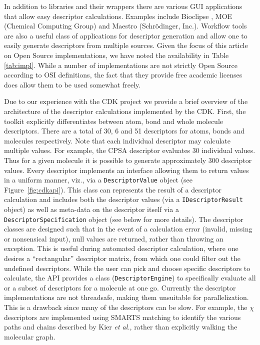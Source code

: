 \documentclass[letterpaper, 12pt]{article}
\begin{document}
In addition to libraries and their wrappers there are various GUI
applications that allow easy descriptor calculations. Examples include
Bioclipse \cite{Spjuth:2007aa}, MOE (Chemical Computing Group) and
Maestro (Schr\"{o}dinger, Inc.). Workflow tools are also a useful
class of applications for descriptor generation and allow one to
easily generate descriptors from multiple sources. Given the focus of
this article on Open Source implementations, we have noted the
availability in Table \ref{tab:impl}. While a number of
implementations are not strictly Open Source according to OSI
definitions, the fact that they provide free academic licenses does
allow them to be used somewhat freely.

Due to our experience with the CDK project we provide a brief overview
of the architecture of the descriptor calculations implemented by the
CDK. First, the toolkit explicitly differentiates between atom, bond
and whole molecule descriptors. There are a total of 30, 6 and 51
descriptors for atoms, bonds and molecules respectively. Note that
each individual descriptor may calculate multiple values. For example,
the CPSA descriptor evaluates 30 individual values. Thus for a given
molecule it is possible to generate approximately 300 descriptor
values. Every descriptor implements an interface allowing them to
return values in a uniform manner, viz., via a \texttt{DescriptorValue}
object (see Figure~\ref{fig:cdkapi}). This class can represents the result
of a descriptor calculation and includes both the descriptor values
(via a \texttt{IDescriptorResult} object) as well as meta-data on the
descriptor itself via a \texttt{DescriptorSpecification} object (see
below for more details). The descriptor classes are designed such that
in the event of a calculation error (invalid, missing or nonsensical
input), null values are returned, rather than throwing an
exception. This is useful during automated descriptor calculation,
where one desires a ``rectangular'' descriptor matrix, from which one
could filter out the undefined descriptors. While the user can pick
and choose specific descriptors to calculate, the API provides a class
(\texttt{DescriptorEngine}) to specifically evaluate all or a subset
of descriptors for a molecule at one go.  Currently the descriptor
implementations are not threadsafe, making them unsuitable for
parallelization. This is a drawback since many of the descriptors can
be slow. For example, the $\chi$ descriptors \cite{Kier:1976aa} are
implemented using SMARTS matching to identify the various paths and
chains described by Kier \textit{et al.}, rather than explicitly walking the
molecular graph.
\end{document}
